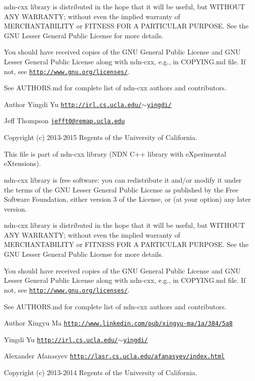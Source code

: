 ndn-\/cxx library is distributed in the hope that it will be useful, but W\+I\+T\+H\+O\+UT A\+NY W\+A\+R\+R\+A\+N\+TY; without even the implied warranty of M\+E\+R\+C\+H\+A\+N\+T\+A\+B\+I\+L\+I\+TY or F\+I\+T\+N\+E\+SS F\+OR A P\+A\+R\+T\+I\+C\+U\+L\+AR P\+U\+R\+P\+O\+SE. See the G\+NU Lesser General Public License for more details.

You should have received copies of the G\+NU General Public License and G\+NU Lesser General Public License along with ndn-\/cxx, e.\+g., in C\+O\+P\+Y\+I\+N\+G.\+md file. If not, see \href{http://www.gnu.org/licenses/}{\tt http\+://www.\+gnu.\+org/licenses/}.

See A\+U\+T\+H\+O\+R\+S.\+md for complete list of ndn-\/cxx authors and contributors.

\begin{DoxyAuthor}{Author}
Yingdi Yu \href{http://irl.cs.ucla.edu/~yingdi/}{\tt http\+://irl.\+cs.\+ucla.\+edu/$\sim$yingdi/} 

Jeff Thompson \href{mailto:jefft0@remap.ucla.edu}{\tt jefft0@remap.\+ucla.\+edu}
\end{DoxyAuthor}
Copyright (c) 2013-\/2015 Regents of the University of California.

This file is part of ndn-\/cxx library (N\+DN C++ library with e\+Xperimental e\+Xtensions).

ndn-\/cxx library is free software\+: you can redistribute it and/or modify it under the terms of the G\+NU Lesser General Public License as published by the Free Software Foundation, either version 3 of the License, or (at your option) any later version.

ndn-\/cxx library is distributed in the hope that it will be useful, but W\+I\+T\+H\+O\+UT A\+NY W\+A\+R\+R\+A\+N\+TY; without even the implied warranty of M\+E\+R\+C\+H\+A\+N\+T\+A\+B\+I\+L\+I\+TY or F\+I\+T\+N\+E\+SS F\+OR A P\+A\+R\+T\+I\+C\+U\+L\+AR P\+U\+R\+P\+O\+SE. See the G\+NU Lesser General Public License for more details.

You should have received copies of the G\+NU General Public License and G\+NU Lesser General Public License along with ndn-\/cxx, e.\+g., in C\+O\+P\+Y\+I\+N\+G.\+md file. If not, see \href{http://www.gnu.org/licenses/}{\tt http\+://www.\+gnu.\+org/licenses/}.

See A\+U\+T\+H\+O\+R\+S.\+md for complete list of ndn-\/cxx authors and contributors.

\begin{DoxyAuthor}{Author}
Xingyu Ma \href{http://www.linkedin.com/pub/xingyu-ma/1a/384/5a8}{\tt http\+://www.\+linkedin.\+com/pub/xingyu-\/ma/1a/384/5a8} 

Yingdi Yu \href{http://irl.cs.ucla.edu/~yingdi/}{\tt http\+://irl.\+cs.\+ucla.\+edu/$\sim$yingdi/} 

Alexander Afanasyev \href{http://lasr.cs.ucla.edu/afanasyev/index.html}{\tt http\+://lasr.\+cs.\+ucla.\+edu/afanasyev/index.\+html}
\end{DoxyAuthor}
Copyright (c) 2013-\/2014 Regents of the University of California.

